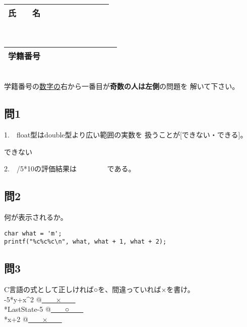 \documentclass[a4j]{jarticle}
\def\an#1{\phantom{#1}}
\def\an#1{{#1}}
\def\ds{\displaystyle}
\begin{document}
\thispagestyle{empty}

\begin{multicols*}{2}%


\def\subst#1#2{$\ds #1$
 \ $\longrightarrow$\ 
 \underline{\hbox to 5cm{\ttfamily #2}}}



\noindent
\begin{tabular}[t]{|c|cccccccc|}\hline
氏　　名 & & & & & & & & \\ \hline
\end{tabular}\\
\begin{tabular}[t]{|c|c|c|c|c|c|c|c|c|c|}\hline
学籍番号 & & & & & & & & \\ \hline
\end{tabular}\\
学籍番号の\underline{数字の}右から一番目が{\bfseries 奇数の人は左側}の問題を
解いて下さい。
\vspace{-5ex}


\subsection*{問1}


1.　float型はdouble型より広い範囲の実数を
扱うことが[できない・できる]。

\ifnum {}
\mbox{}
\else
できない
\fi


2.　{/5*10}の評価結果は　　\ifnum {} \fi　　である。



\subsection*{問2}

何が表示されるか。
\begin{verbatim}
char what = 'm';
printf("%c%c%c\n", what, what + 1, what + 2);
\end{verbatim}

\ifnum {} \fi


\subsection*{問3}


C言語の式として正しければ○を、間違っていれば×を書け。\\
-5*y+x^2       @\underline{\an{　　×　　}}\\
*LastState-5   @\underline{\an{　　○　　}}\\
*x+2          @\underline{\an{　　×　　}}\\





\end{multicols*}
\end{document}
